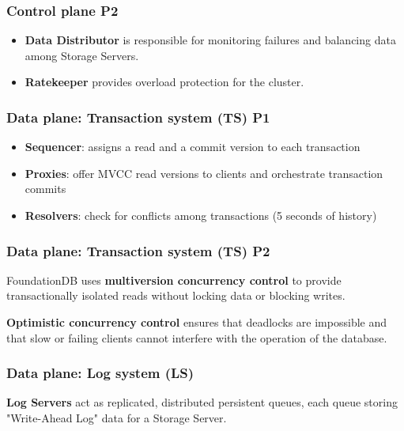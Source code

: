 

\begin{frame}
    \frametitle{Control plane P2}
    
\begin{itemize}
\item \textbf{Data Distributor} is responsible for monitoring failures and balancing data among Storage Servers.
\item \textbf{Ratekeeper} provides overload protection for the cluster.
\end{itemize}
	
\end{frame}


\begin{frame}
	\frametitle{Data plane: Transaction system (TS) P1}
 
\begin{itemize}
    \item \textbf{Sequencer}: assigns a read and a commit version to each transaction
    \item \textbf{Proxies}: offer MVCC read versions to clients and orchestrate transaction commits
    \item \textbf{Resolvers}: check for conflicts among transactions (5 seconds of history)
\end{itemize}
	
\end{frame}


\begin{frame}
	\frametitle{Data plane: Transaction system (TS) P2}

FoundationDB uses \textbf{multiversion concurrency control} to provide transactionally isolated reads without locking data or blocking writes.
\vspace{0.5cm}

\textbf{Optimistic concurrency control} ensures that deadlocks are impossible and that slow or failing clients cannot interfere with the operation of the database.
	
\end{frame}



\begin{frame}
	\frametitle{Data plane: Log system (LS)}

\textbf{Log Servers} act as replicated, distributed persistent queues, each queue storing "Write-Ahead Log" data for a Storage Server.
	
\end{frame}

